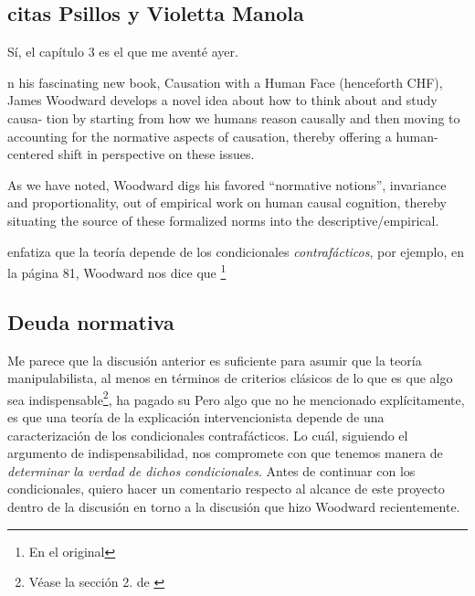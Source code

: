 \subsection{citas Psillos y Violetta Manola}

Sí, el capítulo 3 es el que me aventé ayer. 

n his fascinating new book, Causation with a Human Face (henceforth CHF),
James Woodward develops a novel idea about how to think about and study causa-
tion by starting from how we humans reason causally and then moving to accounting
for the normative aspects of causation, thereby offering a human-centered shift in
perspective on these issues. 


As we have noted, Woodward digs his favored “normative notions”, invariance
and proportionality, out of empirical work on human causal cognition, thereby
situating the source of these formalized norms into the descriptive/empirical.





enfatiza que
la teoría depende de los condicionales
\emph{contrafácticos}, por ejemplo, en la página 81,
Woodward nos dice que \footnote{ 
    En el original 
}
 


\subsection{Deuda normativa}

Me parece que la discusión anterior es suficiente para
asumir que la teoría manipulabilista, al menos en términos
de criterios clásicos de lo que es que algo sea
indispensable\footnote{
  Véase la sección 2. 
  de \parencite{indis}
},
ha pagado su  Pero algo que no he
mencionado explícitamente, es que una teoría de la
explicación intervencionista depende de una caracterización
de los condicionales contrafácticos. Lo cuál, siguiendo el
argumento de indispensabilidad, nos compromete con que
tenemos manera de \emph{determinar la verdad de dichos
condicionales}. Antes de continuar con los condicionales,
quiero hacer un comentario respecto al alcance de este
proyecto dentro de la discusión en torno a la discusión que
hizo Woodward recientemente.

